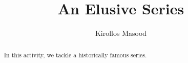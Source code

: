 \documentclass{ximera}
\title{An Elusive Series}
\author{Kirollos Masood}
\begin{document}
\begin{abstract}
In this activity, we tackle a historically famous series.
\end{abstract}
\maketitle
\end{document}

